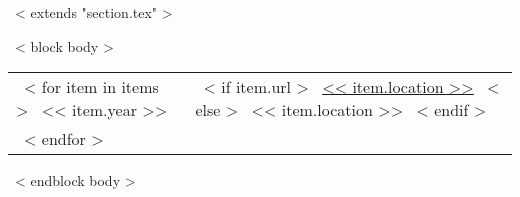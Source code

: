 ~< extends "section.tex" >~

~< block body >~
\begin{tabular}{p{0.5in}p{5in}}
  ~< for item in items >~
    << item.year >> &
    ~< if item.url >~
      \href{<< item.url >>}{<< item.location >>}
    ~< else >~
      << item.location >>
    ~< endif >~ \\
  ~< endfor >~
\end{tabular}
~< endblock body >~
